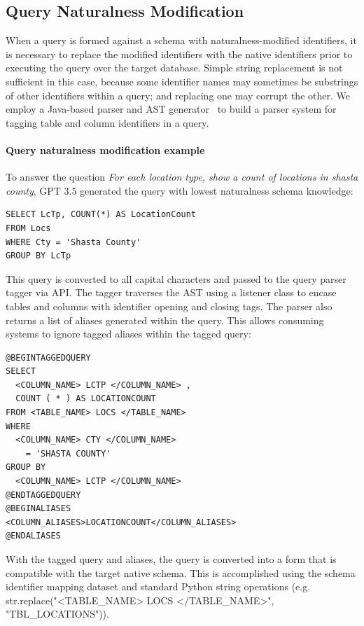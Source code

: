 \subsection{Query Naturalness Modification}
\label{section:querynaturalnessmodification}

When a query is formed against a schema with naturalness-modified identifiers, it is necessary to replace the modified identifiers with the native identifiers prior to executing the query over the target database.
Simple string replacement is not sufficient in this case, because some identifier names may sometimes be substrings of other identifiers within a query; and replacing one may corrupt the other.
We employ a Java-based parser and AST generator~\cite{Parr2014,antlrgrammarsv4} to build a parser system for tagging table and column identifiers in a query.

\paragraph{Query naturalness modification example}

To answer the question \emph{For each location type, show a count of locations in shasta county}, GPT 3.5 generated the query with lowest naturalness schema knowledge:

\begin{verbatim}
SELECT LcTp, COUNT(*) AS LocationCount
FROM Locs
WHERE Cty = 'Shasta County'
GROUP BY LcTp 
\end{verbatim}

This query is converted to all capital characters and passed to the query parser tagger via API.
The tagger traverses the AST using a listener class to encase tables and columns with identifier opening and closing tags. The parser also returns a list of aliases generated within the query.
This allows consuming systems to ignore tagged aliases within the tagged query:

\begin{verbatim}
@BEGINTAGGEDQUERY
SELECT 
  <COLUMN_NAME> LCTP </COLUMN_NAME> , 
  COUNT ( * ) AS LOCATIONCOUNT 
FROM <TABLE_NAME> LOCS </TABLE_NAME> 
WHERE 
  <COLUMN_NAME> CTY </COLUMN_NAME> 
    = 'SHASTA COUNTY' 
GROUP BY 
  <COLUMN_NAME> LCTP </COLUMN_NAME>
@ENDTAGGEDQUERY
@BEGINALIASES
<COLUMN_ALIASES>LOCATIONCOUNT</COLUMN_ALIASES>
@ENDALIASES  
\end{verbatim}

With the tagged query and aliases, the query is converted into a form that is compatible with the target native schema. This is accomplished using the schema identifier mapping dataset and standard Python string operations (e.g. str.replace("<TABLE\_NAME> LOCS </TABLE\_NAME>", "TBL\_LOCATIONS")).

